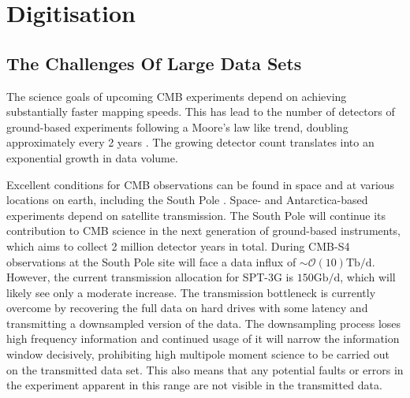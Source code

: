 \documentclass[apj]{emulateapj}
\begin{document}





\section{Digitisation}
\label{sec:dig}

\subsection{The Challenges Of Large Data Sets}
\label{subsec:problem}


The science goals of upcoming CMB experiments depend on achieving substantially faster mapping speeds. This has lead to the number of detectors of ground-based experiments following a Moore's law like trend, doubling approximately every 2 years \citep{s4sciencebook, Abazajian2015}. The growing detector count translates into an exponential growth in data volume.

Excellent conditions for CMB observations can be found in space and at various locations on earth, including the South Pole \citep{kovac2007}. Space- and Antarctica-based experiments depend on satellite transmission. The South Pole will continue its contribution to CMB science in the next generation of ground-based instruments, which aims to collect 2 million detector years in total. During CMB-S4 observations at the South Pole site will face a data influx of $\sim \mathcal{O}(10)\mathrm{Tb/d}$. However, the current transmission allocation for SPT-3G is $150\mathrm{Gb/d}$, which will likely see only a moderate increase. The transmission bottleneck is currently overcome by recovering the full data on hard drives with some latency and transmitting a downsampled version of the data. The downsampling process loses high frequency information and continued usage of it will narrow the information window decisively, prohibiting high multipole moment science to be carried out on the transmitted data set. This also means that any potential faults or errors in the experiment apparent in this range are not visible in the transmitted data. %
\end{document}
